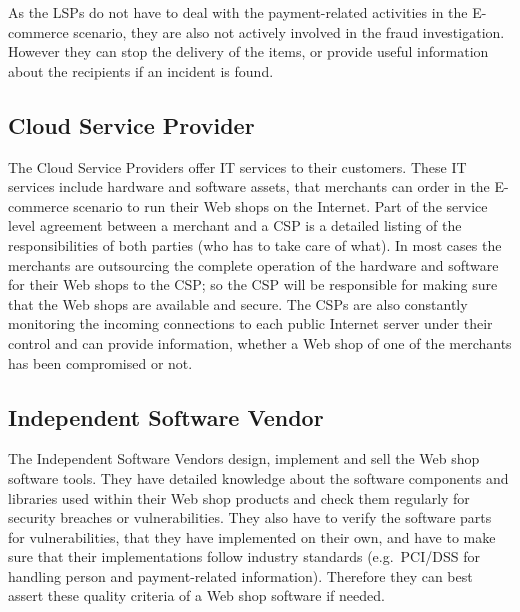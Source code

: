 As the \gls{LSP}s do not have to deal with the payment-related activities in the \gls{E-commerce} scenario, they are also not actively involved in the fraud investigation. However they can stop the delivery of the items, or provide useful information about the recipients if an incident is found.


\subsection{Cloud Service Provider}
\label{subsec:stakeholder_csp}

The Cloud Service Providers offer \gls{IT} services to their customers. These \gls{IT} services include hardware and software assets, that merchants can order in the \gls{E-commerce} scenario to run their Web shops on the Internet. Part of the service level agreement between a merchant and a \gls{CSP} is a detailed listing of the responsibilities of both parties (who has to take care of what). In most cases the merchants are outsourcing the complete operation of the hardware and software for their Web shops to the \gls{CSP}; so the \gls{CSP} will be responsible for making sure that the Web shops are available and secure. The \gls{CSP}s are also constantly monitoring the incoming connections to each public Internet server under their control and can provide information, whether a Web shop of one of the merchants has been compromised or not.


\subsection{Independent Software Vendor}
\label{subsec:stakeholder_isv}

The Independent Software Vendors design, implement and sell the Web shop software tools. They have detailed knowledge about the software components and libraries used within their Web shop products and check them regularly for security breaches or vulnerabilities. They also have to verify the software parts for vulnerabilities, that they have implemented on their own, and have to make sure that their implementations follow industry standards (e.g.\ \gls{PCI/DSS} for handling person and payment-related information). Therefore they can best assert these quality criteria of a Web shop software if needed.


